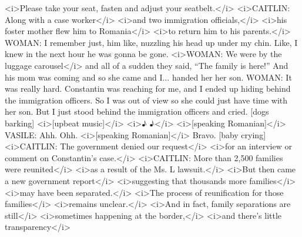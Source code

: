 \begin{itemize}
\begin{itemize}
    \textless{}i\textgreater{}Please take your seat, fasten and adjust
    your seatbelt.\textless{}/i\textgreater{}
    \textless{}i\textgreater{}CAITLIN: Along with a case
    worker\textless{}/i\textgreater{} \textless{}i\textgreater{}and two
    immigration officials,\textless{}/i\textgreater{}
    \textless{}i\textgreater{}his foster mother flew him to
    Romania\textless{}/i\textgreater{} \textless{}i\textgreater{}to
    return him to his parents.\textless{}/i\textgreater{} WOMAN: I
    remember just, him like, nuzzling his head up under my chin. Like, I
    knew in the next hour he was gonna be gone.
    \textless{}i\textgreater{}WOMAN: We were by the luggage
    carousel\textless{}/i\textgreater{} and all of a sudden they said,
    ``The family is here!'' And his mom was coming and so she came and
    I... handed her her son. WOMAN: It was really hard. Constantin was
    reaching for me, and I ended up hiding behind the immigration
    officers. So I was out of view so she could just have time with her
    son. But I just stood behind the immigration officers and cried.
    {[}dogs barking{]} \textless{}i\textgreater{}{[}upbeat
    music{]}\textless{}/i\textgreater{} \textless{}i\textgreater{}♪
    ♪\textless{}/i\textgreater{} \textless{}i\textgreater{}{[}speaking
    Romanian{]}\textless{}/i\textgreater{} VASILE: Ahh. Ohh.
    \textless{}i\textgreater{}{[}speaking
    Romanian{]}\textless{}/i\textgreater{} Bravo. {[}baby crying{]}
    \textless{}i\textgreater{}CAITLIN: The government denied our
    request\textless{}/i\textgreater{} \textless{}i\textgreater{}for an
    interview or comment on Constantin's
    case.\textless{}/i\textgreater{} \textless{}i\textgreater{}CAITLIN:
    More than 2,500 families were reunited\textless{}/i\textgreater{}
    \textless{}i\textgreater{}as a result of the Ms. L
    lawsuit.\textless{}/i\textgreater{} \textless{}i\textgreater{}But
    then came a new government report\textless{}/i\textgreater{}
    \textless{}i\textgreater{}suggesting that thousands more
    families\textless{}/i\textgreater{} \textless{}i\textgreater{}may
    have been separated.\textless{}/i\textgreater{}
    \textless{}i\textgreater{}The process of reunification for those
    families\textless{}/i\textgreater{}
    \textless{}i\textgreater{}remains
    unclear.\textless{}/i\textgreater{} \textless{}i\textgreater{}And in
    fact, family separations are still\textless{}/i\textgreater{}
    \textless{}i\textgreater{}sometimes happening at the
    border,\textless{}/i\textgreater{} \textless{}i\textgreater{}and
    there's little transparency\textless{}/i\textgreater{}

\end{itemize}
\end{itemize}
